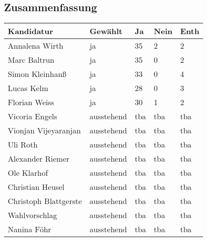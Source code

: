 \subsection{Zusammenfassung}
\begin{center}
    \begin{tabular}{|p{6cm}|m{2cm}|m{1cm}|m{1cm}|m{1cm}|}
        \hline
        Kandidatur & Gewählt & Ja & Nein & Enth\\\hline
		Annalena Wirth & ja & 35 & 2 & 2 \\\hline
		Marc Baltrun & ja & 35 & 0 & 2 \\\hline
		Simon Kleinhanß & ja & 33 & 0 & 4 \\\hline
		Lucas Kelm & ja & 28 & 0 & 3 \\\hline
		Florian Weiss & ja & 30 & 1 & 2 \\\hline
		Vicoria Engels & ausstehend & tba & tba & tba \\\hline
		Vionjan Vijeyaranjan & ausstehend & tba & tba & tba \\\hline
		Uli Roth & ausstehend & tba & tba & tba \\\hline
		Alexander Riemer & ausstehend & tba & tba & tba \\\hline
		Ole Klarhof & ausstehend & tba & tba & tba \\\hline
		Christian Heusel & ausstehend & tba & tba & tba \\\hline
		Christoph Blattgerste & ausstehend & tba & tba & tba \\\hline
		Wahlvorschlag & ausstehend & tba & tba & tba \\\hline
		Nanina Föhr & ausstehend & tba & tba & tba \\\hline
    \end{tabular}
\end{center}